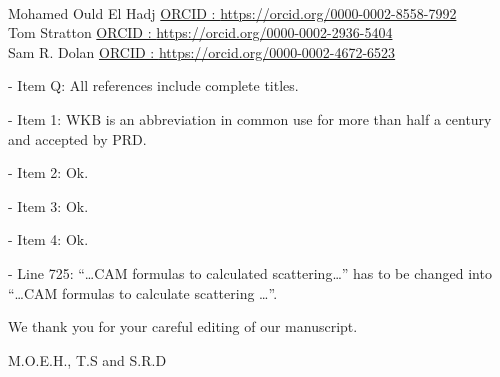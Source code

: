 \documentclass[10pt,a4paper]{report}
\begin{document}



\bigskip


\medskip
{}\\
Mohamed Ould El Hadj \hspace{10pt} \href{https://orcid.org/0000-0002-8558-7992}{\textcolor{orcidlogocol}{ORCID :    }\textcolor{darkbue}{https://orcid.org/0000-0002-8558-7992}}\\
Tom Stratton \hspace{55pt}  \href{https://orcid.org/0000-0002-2936-5404}{\textcolor{orcidlogocol}{ORCID :    }\textcolor{darkbue}{https://orcid.org/0000-0002-2936-5404}}\\
Sam R. Dolan \hspace{53pt} \href{https://orcid.org/0000-0002-4672-6523}{\textcolor{orcidlogocol}{ORCID :    }\textcolor{darkbue}{https://orcid.org/0000-0002-4672-6523}}






\bigskip


\bigskip
\bigskip




\bigskip
{}

\bigskip
\noindent [A] - Item Q: All references include complete titles.

\bigskip
\noindent [B] - Item 1: WKB is an abbreviation in common use for more than half a century and accepted by PRD.

\bigskip
\noindent [C] - Item 2: Ok.

\bigskip
\noindent [D] - Item 3: Ok.

\bigskip
\noindent [E] - Item 4: Ok.



\bigskip
\bigskip


\bigskip
{}


\bigskip
\noindent [I] - Line 725: ``\ldots CAM formulas to calculated scattering\ldots'' has to be changed into ``\ldots CAM formulas to calculate scattering \ldots''.




\bigskip\bigskip\bigskip\bigskip\bigskip



\noindent We thank you for your careful editing of our manuscript.

\noindent  M.O.E.H., T.S and S.R.D
\end{document}
